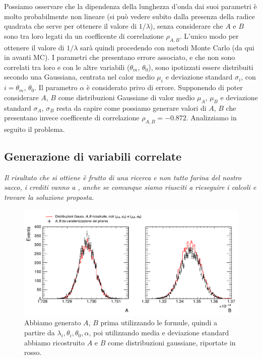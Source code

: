 \documentclass[a4paper,aps,12pt,tightenlines]{revtex4-2}
\begin{document}
Possiamo osservare che la dipendenza della lunghezza d'onda dai suoi parametri è molto probabilmente non lineare (si può vedere subito dalla presenza della radice quadrata che serve per ottenere il valore di $1/\lambda$), senza considerare che $A$ e $B$ sono tra loro legati da un coefficente di correlazione $\rho_{A,B}$. L'unico modo per ottenere il valore di $1/\lambda$ sarà quindi procedendo con metodi Monte Carlo (da qui in avanti MC). I parametri che presentano errore associato, e che non sono correlati tra loro e con le altre variabili ($\theta_m$, $\theta_0$), sono ipotizzati essere distribuiti secondo una Gaussiana, centrata nel calor medio $\mu_i$ e deviazione standard $\sigma_i$, con $i=\theta_m$, $\theta_0$. Il parametro $\alpha$ è considerato privo di errore. Supponendo di poter considerare $A$, $B$ come distribuzioni Gaussiane di valor medio $\mu_A$, $\mu_B$ e deviazione standard $\sigma_A$, $\sigma_B$ resta da capire come possiamo generare valori di $A$, $B$ che presentano invece coefficente di correlazione $\rho_{A,B} = \num{-0.872}$. Analizziamo in seguito il problema.

\subsection{Generazione di variabili correlate}
\emph{Il risultato che si ottiene è frutto di una ricerca e non tutto farina del nostro sacco, i crediti vanno a \cite{anthonyAnswerHowDoes2015, sobolevAnswerHowDoes2015, kaiserSamplePopulationScore1962}, anche se comunque siamo riusciti a rieseguire i calcoli e trovare la soluzione proposta. }

\begin{figure}
\centering
\includegraphics[width=15cm]{../figures_and_tests/gaus_compAB.pdf}
\caption{Abbiamo generato $A$, $B$ prima utilizzando le formule, quindi a partire da $\lambda_i, \theta_i, \theta_0, \alpha$, poi utilizzando media e deviazione standard abbiamo ricostruito $A$ e $B$ come distribuzioni gaussiane, riportate in rosso.\label{fig:A_B_gaus}}
\end{figure}
\end{document}
